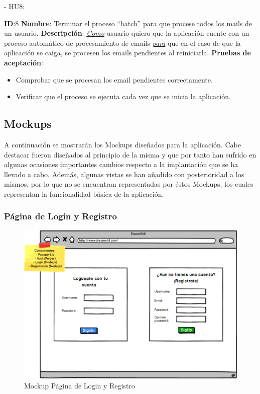 \documentclass[11pt,openany]{book}
\begin{document}
- HU8:
 
\textbf{ID}:8 \textbf{Nombre}: Terminar el proceso ``batch'' para que procese todos los mails de un usuario.\linebreak
\textbf{Descripción}: \textit{\underline{Como}} usuario quiero que la aplicación cuente con un proceso automático de procesamiento de emails \textit{\underline{para}} que en el caso de que la aplicación se caiga, se procesen los emails pendientes al reiniciarla.\linebreak
\textbf{Pruebas de aceptación}:
\begin{itemize}
\item Comprobar que se procesan los email pendientes correctamente.
\item Verificar que el proceso se ejecuta cada vez que se inicia la aplicación.
\end{itemize}

\subsection{Mockups}

A continuación se mostrarán los Mockups diseñados para la aplicación. Cabe destacar fueron diseñados al principio de la misma y que por tanto han sufrido en algunas ocasiones importantes cambios respecto a la implantación que se ha llevado a cabo. Además, algunas vistas se han añadido con posterioridad a los mismos, por lo que no se encuentran representadas por éstos Mockups, los cuales representan la funcionalidad básica de la aplicación.

\subsubsection{Página de Login y Registro}

\begin{figure}[H]
\centering
\includegraphics[totalheight=6.5cm]{mockups/LoginPage.png}
\caption{Mockup Página de Login y Registro}
\end{figure}
\par\bigskip 
\noindent
\end{document}
